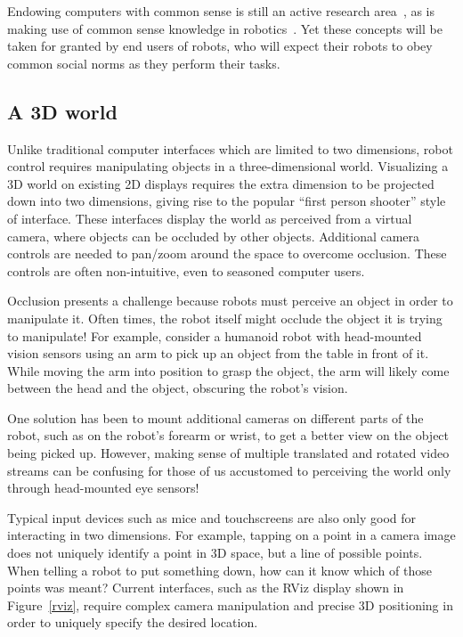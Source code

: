 \documentclass[10pt,twocolumn]{article}
\begin{document}
Endowing computers with common sense is still an active research area~\cite{mueller-cacm09}, as is making use of common sense knowledge in robotics~\cite{gupta-aaai04}. Yet these concepts will be taken for granted by end users of robots, who will expect their robots to obey common social norms as they perform their tasks.

\subsection{A 3D world}


Unlike traditional computer interfaces which are limited to two dimensions, robot control requires manipulating objects in a three-dimensional world. Visualizing a 3D world on existing 2D displays requires the extra dimension to be projected down into two dimensions, giving rise to the popular ``first person shooter'' style of interface. These interfaces display the world as perceived from a virtual camera, where objects can be occluded by other objects. Additional camera controls are needed to pan/zoom around the space to overcome occlusion. These controls are often non-intuitive, even to seasoned computer users.

Occlusion presents a challenge because robots must perceive an object in order to manipulate it.  Often times, the robot itself might occlude the object it is trying to manipulate! For example, consider a humanoid robot with head-mounted vision sensors using an arm to pick up an object from the table in front of it. While moving the arm into position to grasp the object, the arm will likely come between the head and the object, obscuring the robot's vision.

One solution has been to mount additional cameras on different parts of the robot, such as on the robot's forearm or wrist, to get a better view on the object being picked up. However, making sense of multiple translated and rotated video streams can be confusing for those of us accustomed to perceiving the world only through head-mounted eye sensors!

Typical input devices such as mice and touchscreens are also only good for interacting in two dimensions. For example, tapping on a point in a camera image does not uniquely identify a point in 3D space, but a line of possible points. When telling a robot to put something down, how can it know which of those points was meant? Current interfaces, such as the RViz display shown in Figure~\ref{rviz}, require complex camera manipulation and precise 3D positioning in order to uniquely specify the desired location.
\end{document}
